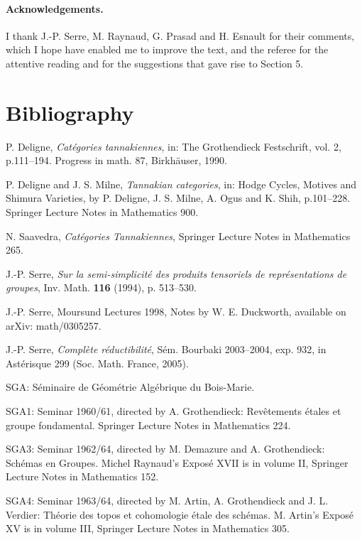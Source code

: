 \documentclass[10pt]{article}
\theoremstyle{deligne}
\begin{document}
\paragraph{Acknowledgements.}
I thank J.-P. Serre, M. Raynaud, G. Prasad and H. Esnault for their comments, which I hope have enabled me to improve the text, and the referee for the attentive reading and for the suggestions that gave rise to Section 5.

\section*{Bibliography}
\begin{description}[labelwidth=2.2em,leftmargin=3.0em,style=sameline]
\item[{[1]}] P. Deligne, \emph{Catégories tannakiennes}, in: The Grothendieck Festschrift, vol. 2, p.111--194. Progress in math. 87, Birkhäuser, 1990.
\item[{[2]}] P. Deligne and J. S. Milne, \emph{Tannakian categories}, in: Hodge Cycles, Motives and Shimura Varieties, by P. Deligne, J. S. Milne, A. Ogus and K. Shih, p.101--228. Springer Lecture Notes in Mathematics 900.
\item[{[3]}] N. Saavedra, \emph{Catégories Tannakiennes}, Springer Lecture Notes in Mathematics 265.
\item[{[4]}] J.-P. Serre, \emph{Sur la semi-simplicité des produits tensoriels de représentations de groupes}, Inv. Math. \textbf{116} (1994), p. 513--530.
\item[{[5]}] J.-P. Serre, Moursund Lectures 1998, Notes by W. E. Duckworth, available on arXiv: math/0305257.
\item[{[6]}] J.-P. Serre, \emph{Complète réductibilité}, Sém. Bourbaki 2003--2004, exp. 932, in Astérisque 299 (Soc. Math. France, 2005).
\end{description}

SGA: Séminaire de Géométrie Algébrique du Bois-Marie.

SGA1: Seminar 1960/61, directed by A. Grothendieck: Revêtements étales et groupe fondamental. Springer Lecture Notes in Mathematics 224.

SGA3: Seminar 1962/64, directed by M. Demazure and A. Grothendieck: Schémas en Groupes. Michel Raynaud's Exposé XVII is in volume II, Springer Lecture Notes in Mathematics 152.

SGA4: Seminar 1963/64, directed by M. Artin, A. Grothendieck and J. L. Verdier: Théorie des topos et cohomologie étale des schémas. M. Artin's Exposé XV is in volume III, Springer Lecture Notes in Mathematics 305.
\end{document}
